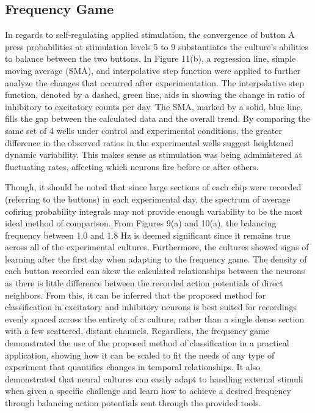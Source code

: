 \documentclass{article} %
\begin{document}
\subsection{Frequency Game}
In regards to self-regulating applied stimulation, the convergence of button A press probabilities at stimulation levels 5 to 9 substantiates the culture's abilities to balance between the two buttons. In Figure 11(b), a regression line, simple moving average (SMA), and interpolative step function were applied to further analyze the changes that occurred after experimentation. The interpolative step function, denoted by a dashed, green line, aids in showing the change in ratio of inhibitory to excitatory counts per day. The SMA, marked by a solid, blue line, fills the gap between the calculated data and the overall trend. By comparing the same set of 4 wells under control and experimental conditions, the greater difference in the observed ratios in the experimental wells suggest heightened dynamic variability. This makes sense as stimulation was being administered at fluctuating rates, affecting which neurons fire before or after others. 

Though, it should be noted that since large sections of each chip were recorded (referring to the buttons) in each experimental day, the spectrum of average cofiring probability integrals may not provide enough variability to be the most ideal method of comparison. From Figures 9(a) and 10(a), the balancing frequency between 1.0 and 1.8 Hz is deemed significant since it remains true across all of the experimental cultures. Furthermore, the cultures showed signs of learning after the first day when adapting to the frequency game. The density of each button recorded can skew the calculated relationships between the neurons as there is little difference between the recorded action potentials of direct neighbors. From this, it can be inferred that the proposed method for classification in excitatory and inhibitory neurons is best suited for recordings evenly spaced across the entirety of a culture, rather than a single dense section with a few scattered, distant channels. Regardless, the frequency game demonstrated the use of the proposed method of classification in a practical application, showing how it can be scaled to fit the needs of any type of experiment that quantifies changes in temporal relationships. It also demonstrated that neural cultures can easily adapt to handling external stimuli when given a specific challenge and learn how to achieve a desired frequency through balancing action potentials sent through the provided tools.
\end{document}
